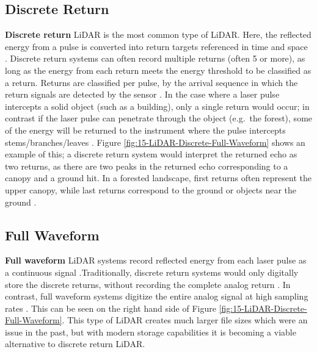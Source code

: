 \documentclass[
]{book}
\begin{document}
\hypertarget{discrete-return}{%
\subsection{Discrete Return}\label{discrete-return}}

\textbf{Discrete return} LiDAR is the most common type of LiDAR. Here, the reflected energy from a pulse is converted into return targets referenced in time and space \citep{white_best_2013}. Discrete return systems can often record multiple returns (often 5 or more), as long as the energy from each return meets the energy threshold to be classified as a return. Returns are classified per pulse, by the arrival sequence in which the return signals are detected by the sensor \citep{uf_geomatics_-_fort_lauderdale_lidar_2016}. In the case where a laser pulse intercepts a solid object (such as a building), only a single return would occur; in contrast if the laser pulse can penetrate through the object (e.g.~the forest), some of the energy will be returned to the instrument where the pulse intercepts stems/branches/leaves \citep{white_best_2013}. Figure \ref{fig:15-LiDAR-Discrete-Full-Waveform} shows an example of this; a discrete return system would interpret the returned echo as two returns, as there are two peaks in the returned echo corresponding to a canopy and a ground hit. In a forested landscape, first returns often represent the upper canopy, while last returns correspond to the ground or objects near the ground \citep{white_best_2013}.

\hypertarget{full-waveform}{%
\subsection{Full Waveform}\label{full-waveform}}

\textbf{Full waveform} LiDAR systems record reflected energy from each laser pulse as a continuous signal \citep{white_best_2013}.Traditionally, discrete return systems would only digitally store the discrete returns, without recording the complete analog return \citep{uf_geomatics_-_fort_lauderdale_lidar_2016}. In contrast, full waveform systems digitize the entire analog signal at high sampling rates \citep{uf_geomatics_-_fort_lauderdale_lidar_2016}. This can be seen on the right hand side of Figure \ref{fig:15-LiDAR-Discrete-Full-Waveform}. This type of LiDAR creates much larger file sizes which were an issue in the past, but with modern storage capabilities it is becoming a viable alternative to discrete return LiDAR.
\end{document}
